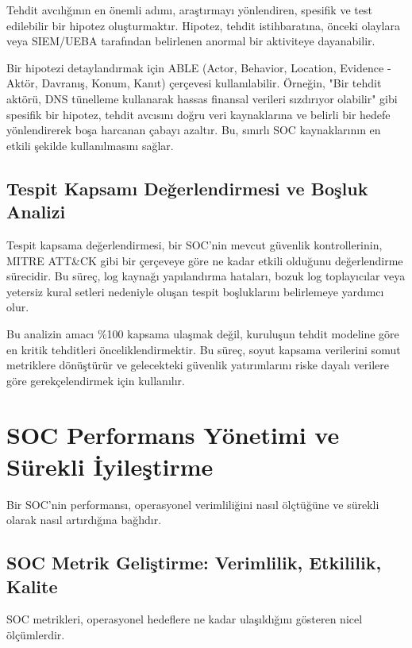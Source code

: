 Tehdit avcılığının en önemli adımı, araştırmayı yönlendiren, spesifik ve test edilebilir bir hipotez oluşturmaktır. Hipotez, tehdit istihbaratına, önceki olaylara veya SIEM/UEBA tarafından belirlenen anormal bir aktiviteye dayanabilir.

Bir hipotezi detaylandırmak için ABLE (Actor, Behavior, Location, Evidence - Aktör, Davranış, Konum, Kanıt) çerçevesi kullanılabilir. Örneğin, "Bir tehdit aktörü, DNS tünelleme kullanarak hassas finansal verileri sızdırıyor olabilir" gibi spesifik bir hipotez, tehdit avcısını doğru veri kaynaklarına ve belirli bir hedefe yönlendirerek boşa harcanan çabayı azaltır. Bu, sınırlı SOC kaynaklarının en etkili şekilde kullanılmasını sağlar.

\subsection{Tespit Kapsamı Değerlendirmesi ve Boşluk Analizi}

Tespit kapsama değerlendirmesi, bir SOC'nin mevcut güvenlik kontrollerinin, MITRE ATT\&CK gibi bir çerçeveye göre ne kadar etkili olduğunu değerlendirme sürecidir. Bu süreç, log kaynağı yapılandırma hataları, bozuk log toplayıcılar veya yetersiz kural setleri nedeniyle oluşan tespit boşluklarını belirlemeye yardımcı olur.

Bu analizin amacı \%100 kapsama ulaşmak değil, kuruluşun tehdit modeline göre en kritik tehditleri önceliklendirmektir. Bu süreç, soyut kapsama verilerini somut metriklere dönüştürür ve gelecekteki güvenlik yatırımlarını riske dayalı verilere göre gerekçelendirmek için kullanılır.

\section{SOC Performans Yönetimi ve Sürekli İyileştirme}

Bir SOC'nin performansı, operasyonel verimliliğini nasıl ölçtüğüne ve sürekli olarak nasıl artırdığına bağlıdır.

\subsection{SOC Metrik Geliştirme: Verimlilik, Etkililik, Kalite}

SOC metrikleri, operasyonel hedeflere ne kadar ulaşıldığını gösteren nicel ölçümlerdir.

